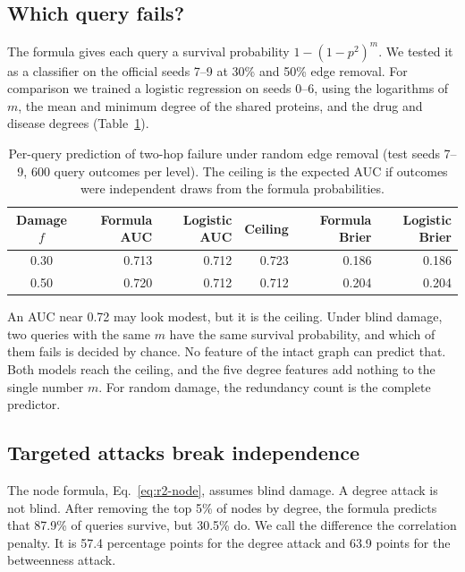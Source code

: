 \subsection{Which query fails?}
\label{sec:prediction-perquery}

The formula gives each query a survival probability $1-(1-p^2)^m$. We tested
it as a classifier on the official seeds 7--9 at 30\% and 50\% edge removal.
For comparison we trained a logistic regression on seeds 0--6, using the
logarithms of $m$, the mean and minimum degree of the shared proteins, and the
drug and disease degrees (Table~\ref{tab:d-perquery}).

\begin{table}[!htbp]
\centering
\small
\caption{Per-query prediction of two-hop failure under random edge removal
(test seeds 7--9, 600 query outcomes per level). The ceiling is the expected AUC
if outcomes were independent draws from the formula probabilities.}
\label{tab:d-perquery}
\begin{tabular}{@{}crrrrr@{}}
\toprule
Damage $f$ & Formula AUC & Logistic AUC & Ceiling & Formula Brier & Logistic Brier \\
\midrule
0.30 & 0.713 & 0.712 & 0.723 & 0.186 & 0.186 \\
0.50 & 0.720 & 0.712 & 0.712 & 0.204 & 0.204 \\
\bottomrule
\end{tabular}
\end{table}

An AUC near 0.72 may look modest, but it is the ceiling. Under blind damage, two
queries with the same $m$ have the same survival probability, and which of them
fails is decided by chance. No feature of the intact graph can predict that.
Both models reach the ceiling, and the five degree features add nothing to the
single number $m$. For random damage, the redundancy count is the complete
predictor.

\subsection{Targeted attacks break independence}
\label{sec:prediction-attack}

The node formula, Eq.~\eqref{eq:r2-node}, assumes blind damage. A degree
attack is not blind. After removing the top 5\% of nodes by degree, the formula
predicts that 87.9\% of queries survive, but 30.5\% do. We call the difference
the correlation penalty. It is 57.4 percentage points for the degree attack and
63.9 points for the betweenness attack.

